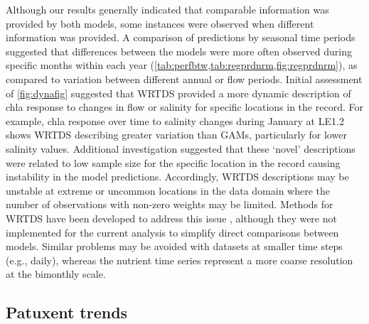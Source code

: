 \documentclass[letterpaper,12pt,oneside]{article}\usepackage[]{graphicx}\usepackage[]{color}
\begin{document}
Although our results generally indicated that comparable information was provided by both models, some instances were observed when different information was provided.  A comparison of predictions by seasonal time periods suggested that differences between the models were more often observed during specific months within each year (\cref{tab:perfbtw,tab:regprdnrm,fig:regprdnrm}), as compared to variation between different annual or flow periods.  Initial assessment of \cref{fig:dynafig} suggested that \ac{WRTDS} provided a more dynamic description of \ac{chla} response to changes in flow or salinity for specific locations in the record.  For example, \ac{chla} response over time to salinity changes during January at LE1.2 shows \ac{WRTDS} describing greater variation than \acp{GAM}, particularly for lower salinity values.  Additional investigation suggested that these `novel' descriptions were related to low sample size for the specific location in the record causing instability in the model predictions.   Accordingly, \ac{WRTDS} descriptions may be unstable at extreme or uncommon locations in the data domain where the number of observations with non-zero weights may be limited.  Methods for \ac{WRTDS} have been developed to address this issue \citep[i.e., automated window width increases with low sample sizes,][]{Hirsch10}, although they were not implemented for the current analysis to simplify direct comparisons between models.  Similar problems may be avoided with datasets at smaller time steps (e.g., daily), whereas the nutrient time series represent a more coarse resolution at the bimonthly scale.    

\subsection{Patuxent trends}
\end{document}
